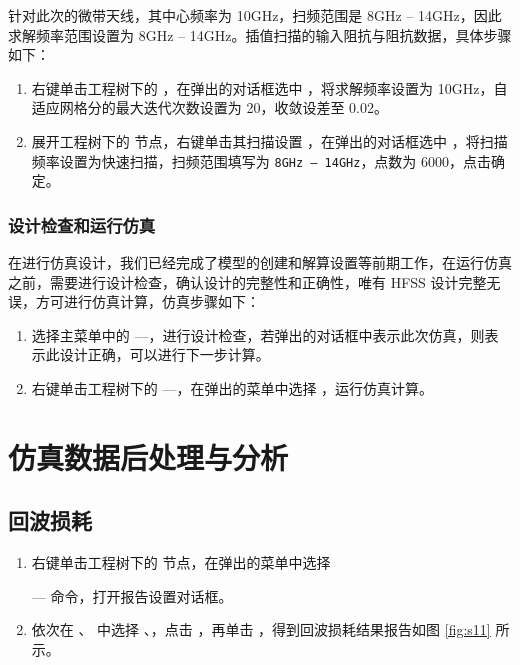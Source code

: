 \documentclass[12pt,a4paper,UTF8]{article}
\begin{document}
针对此次的微带天线，其中心频率为 10GHz，扫频范围是 8GHz -- 14GHz，因此求解频率范围设置为 8GHz -- 14GHz。插值扫描的输入阻抗与阻抗数据，具体步骤如下：

\begin{enumerate}
    \item 右键单击工程树下的 ，在弹出的对话框选中 ，将求解频率设置为 10GHz，自适应网格分的最大迭代次数设置为 20，收敛设差至 0.02。
    
    \item 展开工程树下的  节点，右键单击其扫描设置 ，在弹出的对话框选中 ，将扫描频率设置为快速扫描，扫频范围填写为 \texttt{8GHz -- 14GHz}，点数为 6000，点击确定。
\end{enumerate}

\subsubsection{设计检查和运行仿真}

在进行仿真设计，我们已经完成了模型的创建和解算设置等前期工作，在运行仿真之前，需要进行设计检查，确认设计的完整性和正确性，唯有 HFSS 设计完整无误，方可进行仿真计算，仿真步骤如下：

\begin{enumerate}
    \item 选择主菜单中的 —，进行设计检查，若弹出的对话框中表示此次仿真，则表示此设计正确，可以进行下一步计算。
    
    \item 右键单击工程树下的 —，在弹出的菜单中选择 ，运行仿真计算。
\end{enumerate}

\section{仿真数据后处理与分析}

\subsection{回波损耗}

\begin{enumerate}
    \item 右键单击工程树下的  节点，在弹出的菜单中选择
    
    — 命令，打开报告设置对话框。
    
    \item 依次在 、 中选择 、，点击 ，再单击 ，得到回波损耗结果报告如图 \ref{fig:s11} 所示。
\end{enumerate}
\end{document}
